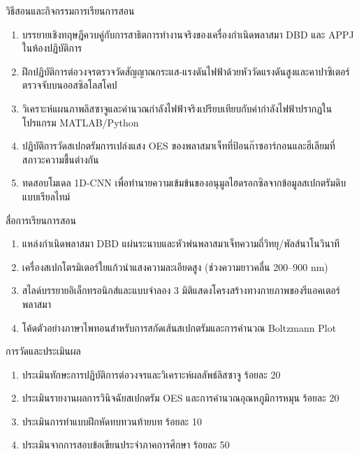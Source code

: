 \newpage

\begin{planbox}{วิธีสอนและกิจกรรมการเรียนการสอน}
\begin{enumerate}
    \item บรรยายเชิงทฤษฎีควบคู่กับการสาธิตการทำงานจริงของเครื่องกำเนิดพลาสมา DBD และ APPJ ในห้องปฏิบัติการ
    \item ฝึกปฏิบัติการต่อวงจรตรวจวัดสัญญาณกระแส-แรงดันไฟฟ้าด้วยหัววัดแรงดันสูงและคาปาซิเตอร์ตรวจจับบนออสซิลโลสโคป
    \item วิเคราะห์แผนภาพลิสซาจูและคำนวณกำลังไฟฟ้าจริงเปรียบเทียบกับค่ากำลังไฟฟ้าปรากฏในโปรแกรม MATLAB/Python
    \item ปฏิบัติการวัดสเปกตรัมการเปล่งแสง OES ของพลาสมาเจ็ทที่ป้อนก๊าซอาร์กอนและฮีเลียมที่สภาวะความชื้นต่างกัน
    \item ทดสอบโมเดล 1D-CNN เพื่อทำนายความเข้มข้นของอนุมูลไฮดรอกซิลจากข้อมูลสเปกตรัมดิบแบบเรียลไทม์
\end{enumerate}
\end{planbox}

\begin{planbox}{สื่อการเรียนการสอน}
\begin{enumerate}
    \item แหล่งกำเนิดพลาสมา DBD แผ่นระนาบและหัวพ่นพลาสมาเจ็ทความถี่วิทยุ/พัลส์นาโนวินาที
    \item เครื่องสเปกโตรมิเตอร์ใยแก้วนำแสงความละเอียดสูง (ช่วงความยาวคลื่น 200--900 nm)
    \item สไลด์บรรยายอิเล็กทรอนิกส์และแบบจำลอง 3 มิติแสดงโครงสร้างทางกายภาพของรีแอคเตอร์พลาสมา
    \item โค้ดตัวอย่างภาษาไพทอนสำหรับการสกัดเส้นสเปกตรัมและการคำนวณ Boltzmann Plot
\end{enumerate}
\end{planbox}

\begin{planbox}{การวัดและประเมินผล}
\begin{enumerate}
    \item ประเมินทักษะการปฏิบัติการต่อวงจรและวิเคราะห์ผลลัพธ์ลิสซาจู ร้อยละ 20
    \item ประเมินรายงานผลการวินิจฉัยสเปกตรัม OES และการคำนวณอุณหภูมิการหมุน ร้อยละ 20
    \item ประเมินการทำแบบฝึกหัดทบทวนท้ายบท ร้อยละ 10
    \item ประเมินจากการสอบข้อเขียนประจำภาคการศึกษา ร้อยละ 50
\end{enumerate}
\end{planbox}

